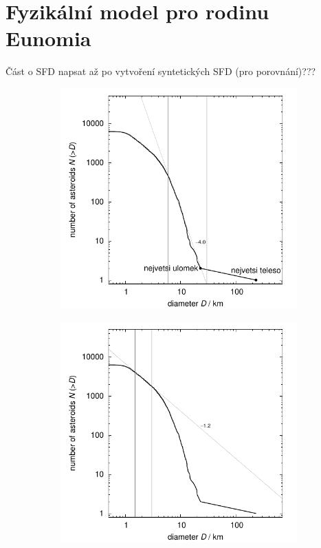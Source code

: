 \documentclass[A4paper, 12pt, oneside]{book}
\begin{document}
\section{Fyzikální model pro rodinu Eunomia}

Část o SFD napsat až po vytvoření syntetických SFD (pro porovnání)???
\begin{figure}
	\centering
	\begin{subfigure}[b]{0.45\textwidth}
	\includegraphics[width=\textwidth]{obr/size_distribution}
	\end{subfigure}
	\begin{subfigure}[b]{0.45\textwidth}
	\includegraphics[width=\textwidth]{obr/size_distribution_SMALLD}

\end{subfigure}
\end{figure}
\end{document}
